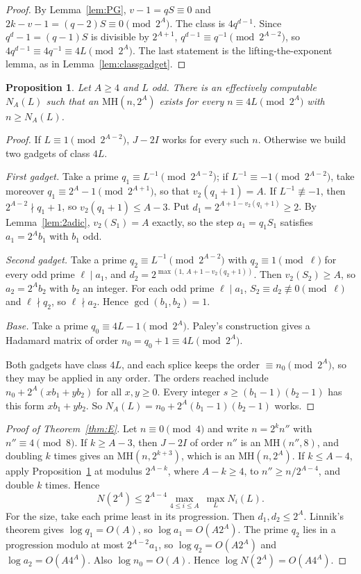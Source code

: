 \documentclass[10pt]{article}
\newtheorem{proposition}[lemma]{Proposition}
\theoremstyle{remark}
\newcommand{\MH}{\mathrm{MH}}
\begin{document}
\begin{proof}
By Lemma~\ref{lem:PG}, $v-1=qS\equiv0$ and $2k-v-1=(q-2)S\equiv0\pmod{2^A}$. The class is $4q^{d-1}$. Since $q^d-1=(q-1)S$ is divisible by $2^{A+1}$, $q^{d-1}\equiv q^{-1}\pmod{2^{A-2}}$, so $4q^{d-1}\equiv4q^{-1}\equiv 4L\pmod{2^A}$. The last statement is the lifting-the-exponent lemma, as in Lemma~\ref{lem:classgadget}.
\end{proof}

\begin{proposition}\label{prop:2A}
Let $A\ge4$ and $L$ odd. There is an effectively computable $N_A(L)$ such that an $\MH(n,2^A)$ exists for every $n\equiv4L\pmod{2^A}$ with $n\ge N_A(L)$.
\end{proposition}

\begin{proof}
If $L\equiv1\pmod{2^{A-2}}$, $J-2I$ works for every such $n$. Otherwise we build two gadgets of class $4L$.

\emph{First gadget.} Take a prime $q_1\equiv L^{-1}\pmod{2^{A-2}}$; if $L^{-1}\equiv-1\pmod{2^{A-2}}$, take moreover $q_1\equiv2^A-1\pmod{2^{A+1}}$, so that $v_2(q_1+1)=A$. If $L^{-1}\not\equiv-1$, then $2^{A-2}\nmid q_1+1$, so $v_2(q_1+1)\le A-3$. Put $d_1=2^{A+1-v_2(q_1+1)}\ge2$. By Lemma~\ref{lem:2adic}, $v_2(S_1)=A$ exactly, so the step $a_1=q_1S_1$ satisfies $a_1=2^Ab_1$ with $b_1$ odd.

\emph{Second gadget.} Take a prime $q_2\equiv L^{-1}\pmod{2^{A-2}}$ with $q_2\equiv1\pmod\ell$ for every odd prime $\ell\mid a_1$, and $d_2=2^{\max(1,\,A+1-v_2(q_2+1))}$. Then $v_2(S_2)\ge A$, so $a_2=2^Ab_2$ with $b_2$ an integer. For each odd prime $\ell\mid a_1$, $S_2\equiv d_2\not\equiv0\pmod\ell$ and $\ell\nmid q_2$, so $\ell\nmid a_2$. Hence $\gcd(b_1,b_2)=1$.

\emph{Base.} Take a prime $q_0\equiv4L-1\pmod{2^A}$. Paley's construction gives a Hadamard matrix of order $n_0=q_0+1\equiv4L\pmod{2^A}$.

Both gadgets have class $4L$, and each splice keeps the order $\equiv n_0\pmod{2^A}$, so they may be applied in any order. The orders reached include $n_0+2^A(xb_1+yb_2)$ for all $x,y\ge0$. Every integer $s\ge(b_1-1)(b_2-1)$ has this form $xb_1+yb_2$. So $N_A(L)=n_0+2^A(b_1-1)(b_2-1)$ works.
\end{proof}

\begin{proof}[Proof of Theorem~\ref{thm:E}]
Let $n\equiv0\pmod4$ and write $n=2^kn''$ with $n''\equiv4\pmod8$. If $k\ge A-3$, then $J-2I$ of order $n''$ is an $\MH(n'',8)$, and doubling $k$ times gives an $\MH(n,2^{k+3})$, which is an $\MH(n,2^A)$. If $k\le A-4$, apply Proposition~\ref{prop:2A} at modulus $2^{A-k}$, where $A-k\ge4$, to $n''\ge n/2^{A-4}$, and double $k$ times. Hence
\[
N(2^A)\le2^{A-4}\max_{4\le i\le A}\ \max_{L}N_i(L).
\]
For the size, take each prime least in its progression. Then $d_1,d_2\le2^A$. Linnik's theorem gives $\log q_1=O(A)$, so $\log a_1=O(A2^A)$. The prime $q_2$ lies in a progression modulo at most $2^{A-2}a_1$, so $\log q_2=O(A2^A)$ and $\log a_2=O(A4^A)$. Also $\log n_0=O(A)$. Hence $\log N(2^A)=O(A4^A)$.
\end{proof}
\end{document}

